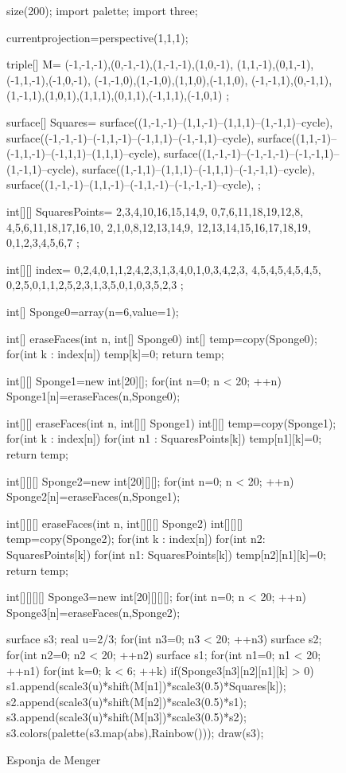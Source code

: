 \documentclass[a4paper]{book}
\begin{document}
\begin{figure}[!ht]
	\centering
	\begin{asy}
	size(200);
	import palette;
	import three;

	currentprojection=perspective(1,1,1);

	triple[] M=
	{
	(-1,-1,-1),(0,-1,-1),(1,-1,-1),(1,0,-1),
	(1,1,-1),(0,1,-1),(-1,1,-1),(-1,0,-1),
	(-1,-1,0),(1,-1,0),(1,1,0),(-1,1,0),
	(-1,-1,1),(0,-1,1),(1,-1,1),(1,0,1),(1,1,1),(0,1,1),(-1,1,1),(-1,0,1)
	};

	surface[] Squares=
	{
	surface((1,-1,-1)--(1,1,-1)--(1,1,1)--(1,-1,1)--cycle),
	surface((-1,-1,-1)--(-1,1,-1)--(-1,1,1)--(-1,-1,1)--cycle),
	surface((1,1,-1)--(-1,1,-1)--(-1,1,1)--(1,1,1)--cycle),
	surface((1,-1,-1)--(-1,-1,-1)--(-1,-1,1)--(1,-1,1)--cycle),
	surface((1,-1,1)--(1,1,1)--(-1,1,1)--(-1,-1,1)--cycle),
	surface((1,-1,-1)--(1,1,-1)--(-1,1,-1)--(-1,-1,-1)--cycle),
	};

	int[][] SquaresPoints=
	{
	{2,3,4,10,16,15,14,9},
	{0,7,6,11,18,19,12,8},
	{4,5,6,11,18,17,16,10},
	{2,1,0,8,12,13,14,9},
	{12,13,14,15,16,17,18,19},
	{0,1,2,3,4,5,6,7}
	};

	int[][] index=
	{
	{0,2,4},{0,1},{1,2,4},{2,3},{1,3,4},{0,1},{0,3,4},{2,3},
	{4,5},{4,5},{4,5},{4,5},
	{0,2,5},{0,1},{1,2,5},{2,3},{1,3,5},{0,1},{0,3,5},{2,3}
	};

	int[] Sponge0=array(n=6,value=1);

	int[] eraseFaces(int n, int[] Sponge0) {
	int[] temp=copy(Sponge0);
	for(int k : index[n]) {
	temp[k]=0;
	}
	return temp;
	}

	int[][] Sponge1=new int[20][];
	for(int n=0; n < 20; ++n) {
	Sponge1[n]=eraseFaces(n,Sponge0);
	}

	int[][] eraseFaces(int n, int[][] Sponge1) {
	int[][] temp=copy(Sponge1);
	for(int k : index[n])
	for(int n1 : SquaresPoints[k])
	temp[n1][k]=0;
	return temp;
	}

	int[][][] Sponge2=new int[20][][];
	for(int n=0; n < 20; ++n)
	Sponge2[n]=eraseFaces(n,Sponge1);

	int[][][] eraseFaces(int n, int[][][] Sponge2) {
	int[][][] temp=copy(Sponge2);
	for(int k : index[n])
	for(int n2: SquaresPoints[k])
	for(int n1: SquaresPoints[k])
	temp[n2][n1][k]=0;
	return temp;
	}

	int[][][][] Sponge3=new int[20][][][];
	for(int n=0; n < 20; ++n)
	Sponge3[n]=eraseFaces(n,Sponge2);

	surface s3;
	real u=2/3;
	for(int n3=0; n3 < 20; ++n3) {
	surface s2;
	for(int n2=0; n2 < 20; ++n2) {
	surface s1;
	for(int n1=0; n1 < 20; ++n1) {
	for(int k=0; k < 6; ++k) {
	if(Sponge3[n3][n2][n1][k] > 0) {
	s1.append(scale3(u)*shift(M[n1])*scale3(0.5)*Squares[k]);
	}
	}
	}
	s2.append(scale3(u)*shift(M[n2])*scale3(0.5)*s1);
	}
	s3.append(scale3(u)*shift(M[n3])*scale3(0.5)*s2);
	}
	s3.colors(palette(s3.map(abs),Rainbow()));
	draw(s3);
	\end{asy}

	\caption{Esponja de Menger}
\end{figure}
\end{document}
